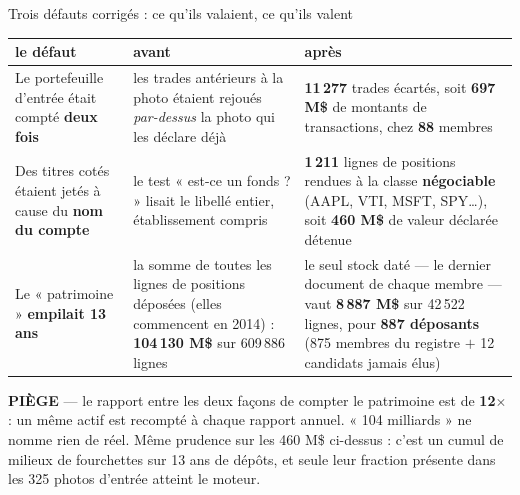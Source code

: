 \documentclass[11pt,aspectratio=169]{beamer}
\newcommand{\defl}[1]{{\scriptsize\color{black!55}#1}}
\newcommand{\piege}[1]{%
  \colorbox{warnorange!12}{\parbox{\dimexpr\linewidth-8pt}{\scriptsize
    \textbf{\textcolor{warnorange}{PIÈGE}}\; --- #1}}}
\begin{document}
\begin{frame}{Trois défauts corrigés : ce qu'ils valaient, ce qu'ils valent}
  \vspace{0pt}
  {\scriptsize
  \begin{tabular}{@{}>{\raggedright\arraybackslash}p{}>{\raggedright\arraybackslash}p{}>{\raggedright\arraybackslash}p{}@{}}
    \toprule
    \textbf{le défaut} & \textbf{avant} & \textbf{après}\\
    \midrule
    Le portefeuille d'entrée était compté \textbf{deux fois}
      & les trades antérieurs à la photo étaient rejoués \emph{par-dessus} la photo qui les
        déclare déjà
      & \textbf{11\,277} trades écartés, soit \textbf{697 M\$} de montants de transactions,
        chez \textbf{88} membres\\
    \addlinespace[0.6mm]
    Des titres cotés étaient jetés à cause du \textbf{nom du compte}
      & le test « est-ce un fonds ? » lisait le libellé entier, établissement compris
      & \textbf{1\,211} lignes de positions rendues à la classe \textbf{négociable}
        (AAPL, VTI, MSFT, SPY\ldots), soit \textbf{460 M\$} de valeur déclarée détenue\\
    \addlinespace[0.6mm]
    Le « patrimoine » \textbf{empilait 13 ans}
      & la somme de toutes les lignes de positions déposées \defl{(elles commencent en 2014)} :
        \textbf{104\,130 M\$} sur 609\,886 lignes
      & le seul stock daté --- le dernier document de chaque membre --- vaut
        \textbf{8\,887 M\$} sur 42\,522 lignes, pour \textbf{887 déposants}
        \defl{(875 membres du registre $+$ 12 candidats jamais élus)}\\
    \bottomrule
  \end{tabular}}\par\vspace{2.5mm}
  \piege{le rapport entre les deux façons de compter le patrimoine est de \textbf{12$\times$} :
  un même actif est recompté à chaque rapport annuel. « 104 milliards » ne nomme rien de réel.
  Même prudence sur les 460 M\$ ci-dessus : c'est un cumul de milieux de fourchettes sur
  13 ans de dépôts, et seule leur fraction présente dans les 325 photos d'entrée atteint
  le moteur.}
\end{frame}
\end{document}
